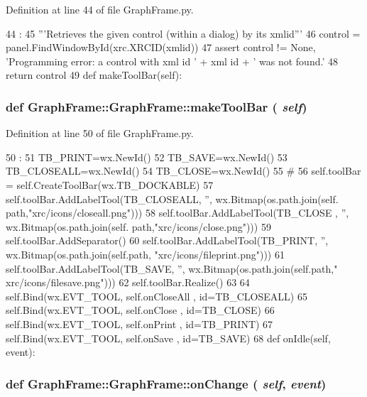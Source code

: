 Definition at line 44 of file GraphFrame.py.


\begin{DoxyCode}
44                                       :
45         '''Retrieves the given control (within a dialog) by its xmlid'''
46         control = panel.FindWindowById(xrc.XRCID(xmlid))
47         assert control != None, 'Programming error: a control with xml id ' + xml
      id + ' was not found.'
48         return control
49         
    def makeToolBar(self):
\end{DoxyCode}
\hypertarget{classGraphFrame_1_1GraphFrame_af0d04ced9a305bf098ffe9785bd8bfda}{
\subsubsection[{makeToolBar}]{\setlength{\rightskip}{0pt plus 5cm}def GraphFrame::GraphFrame::makeToolBar ( {\em self})}}
\label{classGraphFrame_1_1GraphFrame_af0d04ced9a305bf098ffe9785bd8bfda}


Definition at line 50 of file GraphFrame.py.


\begin{DoxyCode}
50                          :
51         TB_PRINT=wx.NewId()
52         TB_SAVE=wx.NewId()
53         TB_CLOSEALL=wx.NewId()
54         TB_CLOSE=wx.NewId()
55         #
56         self.toolBar = self.CreateToolBar(wx.TB_DOCKABLE)
57         self.toolBar.AddLabelTool(TB_CLOSEALL, '', wx.Bitmap(os.path.join(self.
      path,"xrc/icons/closeall.png")))
58         self.toolBar.AddLabelTool(TB_CLOSE  , '', wx.Bitmap(os.path.join(self.
      path,"xrc/icons/close.png")))
59         self.toolBar.AddSeparator()        
60         self.toolBar.AddLabelTool(TB_PRINT, '', wx.Bitmap(os.path.join(self.path,
      "xrc/icons/fileprint.png")))
61         self.toolBar.AddLabelTool(TB_SAVE, '', wx.Bitmap(os.path.join(self.path,"
      xrc/icons/filesave.png")))        
62         self.toolBar.Realize()
63 
64         self.Bind(wx.EVT_TOOL, self.onCloseAll , id=TB_CLOSEALL)
65         self.Bind(wx.EVT_TOOL, self.onClose , id=TB_CLOSE)
66         self.Bind(wx.EVT_TOOL, self.onPrint , id=TB_PRINT)
67         self.Bind(wx.EVT_TOOL, self.onSave  , id=TB_SAVE)
68                         
    def onIdle(self, event):
\end{DoxyCode}
\hypertarget{classGraphFrame_1_1GraphFrame_ac44836eb5e10a1fa2702d1c73d4ae49a}{
\subsubsection[{onChange}]{\setlength{\rightskip}{0pt plus 5cm}def GraphFrame::GraphFrame::onChange ( {\em self}, \/   {\em event})}}
\label{classGraphFrame_1_1GraphFrame_ac44836eb5e10a1fa2702d1c73d4ae49a}


